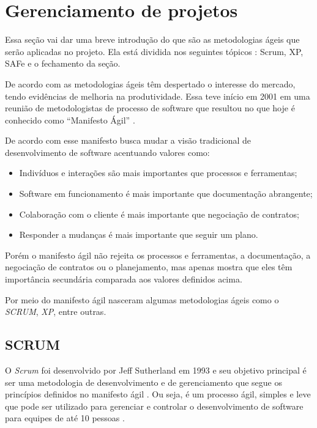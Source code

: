 \section{Gerenciamento de projetos}

Essa seção vai dar uma breve introdução do que são as metodologias ágeis que serão aplicadas no projeto. Ela está dividida nos seguintes tópicos : Scrum, XP, SAFe e o fechamento da seção.

De acordo com \cite{lima} as metodologias ágeis têm despertado o interesse do mercado, tendo evidências de melhoria na produtividade. Essa teve início em 2001 em uma reunião de metodologistas de processo de software que resultou no que hoje é conhecido como “Manifesto Ágil” \cite{beck}.

De acordo com \cite{beck} esse manifesto busca mudar a visão tradicional de desenvolvimento de software acentuando valores como:

\begin{itemize}
  \item Indivíduos e interações são mais importantes que processos e ferramentas;
  \item Software em funcionamento é mais importante que documentação abrangente;
  \item Colaboração com o cliente é mais importante que negociação de contratos;
  \item Responder a mudanças é mais importante que seguir um plano.
\end{itemize}

Porém o manifesto ágil não rejeita os processos e ferramentas, a documentação, a negociação de contratos ou o planejamento, mas apenas mostra que eles têm importância secundária comparada aos valores definidos acima. \cite{lima}

Por meio do manifesto ágil nasceram algumas metodologias ágeis como o \textit{SCRUM}, \textit{XP}, entre outras.

\subsection{SCRUM}

O \textit{Scrum} foi desenvolvido por Jeff Sutherland em 1993 e seu objetivo principal é ser uma metodologia de desenvolvimento e de gerenciamento que segue os princípios definidos no manifesto ágil \cite{lima}. Ou seja, é um processo ágil, simples e leve que pode ser utilizado para gerenciar e controlar o desenvolvimento de software para equipes de até 10 pessoas \cite{diniz}.

